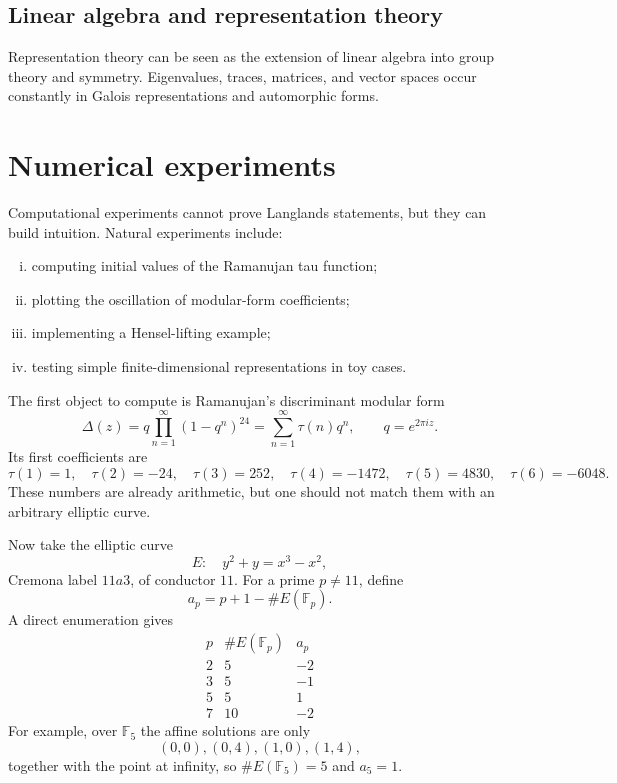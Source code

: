 \subsection{Linear algebra and representation theory}

Representation theory can be seen as the extension of linear algebra into group theory and symmetry.  Eigenvalues, traces, matrices, and vector spaces occur constantly in Galois representations and automorphic forms.

\section{Numerical experiments}

Computational experiments cannot prove Langlands statements, but they can build intuition.  Natural experiments include:
\begin{enumerate}[(i)]
  \item computing initial values of the Ramanujan tau function;
  \item plotting the oscillation of modular-form coefficients;
  \item implementing a Hensel-lifting example;
  \item testing simple finite-dimensional representations in toy cases.
\end{enumerate}

The first object to compute is Ramanujan's discriminant modular form
\[
  \Delta(z)=q\prod_{n=1}^{\infty}(1-q^n)^{24}
  =\sum_{n=1}^{\infty}\tau(n)q^n,
  \qquad q=e^{2\pi iz}.
\]
Its first coefficients are
\[
  \tau(1)=1,
  \quad
  \tau(2)=-24,
  \quad
  \tau(3)=252,
  \quad
  \tau(4)=-1472,
  \quad
  \tau(5)=4830,
  \quad
  \tau(6)=-6048.
\]
These numbers are already arithmetic, but one should not match them with an arbitrary elliptic curve.

Now take the elliptic curve
\[
  E:\quad y^2+y=x^3-x^2,
\]
Cremona label \(11a3\), of conductor \(11\).  For a prime \(p\ne11\), define
\[
  a_p=p+1-\#E(\mathbb F_p).
\]
A direct enumeration gives
\[
\begin{array}{c|c|c}
p&\#E(\mathbb F_p)&a_p\\ \hline
2&5&-2\\
3&5&-1\\
5&5&1\\
7&10&-2
\end{array}
\]
For example, over \(\mathbb F_5\) the affine solutions are only
\[
  (0,0),(0,4),(1,0),(1,4),
\]
together with the point at infinity, so \(\#E(\mathbb F_5)=5\) and \(a_5=1\).

